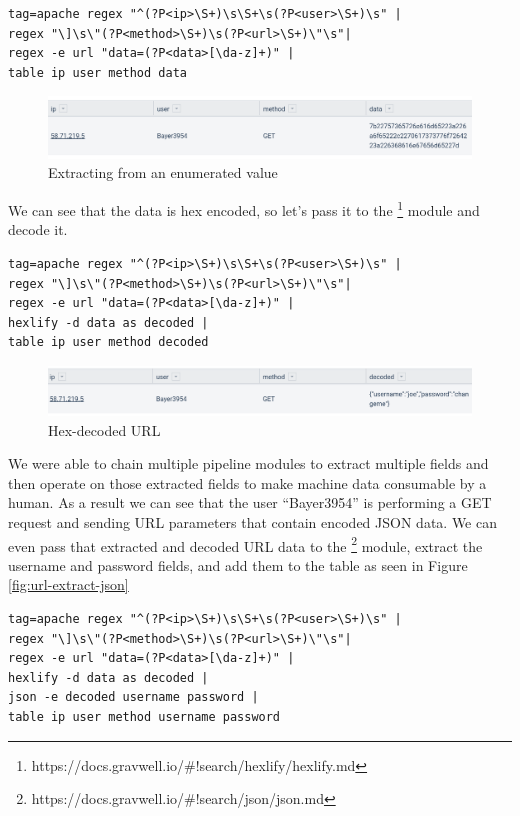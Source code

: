 \begin{Verbatim}[breaklines=true]
tag=apache regex "^(?P<ip>\S+)\s\S+\s(?P<user>\S+)\s" |
regex "\]\s\"(?P<method>\S+)\s(?P<url>\S+)\"\s"|
regex -e url "data=(?P<data>[\da-z]+)" |
table ip user method data
\end{Verbatim}

\begin{figure}
	\includegraphics[width=0.8\linewidth]{images/extract-ev.png}
	\caption{Extracting from an enumerated value}
	\label{fig:extract-ev}
\end{figure}

\begin{samepage}
We can see that the data is hex encoded, so let's pass it to the
\footnote{https://docs.gravwell.io/\#!search/hexlify/hexlify.md} module
and decode it.

\begin{Verbatim}[breaklines=true]
tag=apache regex "^(?P<ip>\S+)\s\S+\s(?P<user>\S+)\s" |
regex "\]\s\"(?P<method>\S+)\s(?P<url>\S+)\"\s"|
regex -e url "data=(?P<data>[\da-z]+)" |
hexlify -d data as decoded |
table ip user method decoded
\end{Verbatim}
\end{samepage}

\begin{figure}
	\includegraphics[width=0.8\linewidth]{images/hex-decode-url.png}
	\caption{Hex-decoded URL}
	\label{fig:hex-decode-url} 
\end{figure}


We were able to chain multiple pipeline modules to extract multiple
fields and then operate on those extracted fields to make machine data
consumable by a human. As a result we can see that the user
``Bayer3954'' is performing a GET request and sending URL parameters
that contain encoded JSON data. We can even pass that extracted and
decoded URL data to the \footnote{https://docs.gravwell.io/\#!search/json/json.md}
module, extract the username and password fields, and add them to the table as
seen in Figure \ref{fig:url-extract-json}

\begin{Verbatim}[breaklines=true]
tag=apache regex "^(?P<ip>\S+)\s\S+\s(?P<user>\S+)\s" |
regex "\]\s\"(?P<method>\S+)\s(?P<url>\S+)\"\s"|
regex -e url "data=(?P<data>[\da-z]+)" |
hexlify -d data as decoded |
json -e decoded username password |
table ip user method username password
\end{Verbatim}

